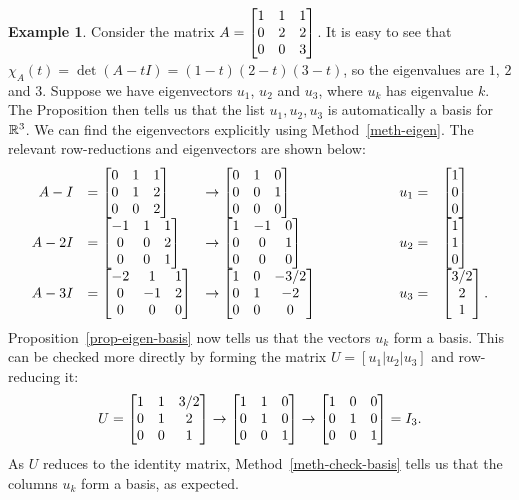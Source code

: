 \documentclass[reqno]{amsart}
\theoremstyle{definition}
\newtheorem{example}[theorem]{Example}
\begin{document}
\begin{example}\label{eg-eigen-basis-i}
 Consider the matrix $A=\left[\begin{matrix} 1&1&1 \\ 0&2&2 \\ 0&0&3\end{matrix}\right]$.  It is easy
 to see that $\chi_A(t)=\det(A-tI)=(1-t)(2-t)(3-t)$, so the
 eigenvalues are $1$, $2$ and $3$.  Suppose we have eigenvectors
 $u_1$, $u_2$ and $u_3$, where $u_k$ has eigenvalue $k$.  The
 Proposition then tells us that the list $u_1,u_2,u_3$ is
 automatically a basis for ${\mathbb{R}}^3$.  We can find the eigenvectors
 explicitly using Method~\ref{meth-eigen}.  The relevant
 row-reductions and eigenvectors are shown below:
 \[ \begin{array}{rllcrl}
  A-I  &=   \left[\begin{matrix} 0 & 1 & 1 \\ 0 & 1 & 2 \\ 0 & 0 & 2 \end{matrix}\right]
       &\to \left[\begin{matrix} 0 & 1 & 0 \\ 0 & 0 & 1 \\ 0 & 0 & 0 \end{matrix}\right]
       & \hspace{4em} & u_1 = & \left[\begin{matrix} 1 \\ 0 \\ 0 \end{matrix}\right] \\
  A-2I &=   \left[\begin{matrix}-1 & 1 & 1 \\ 0 & 0 & 2 \\ 0 & 0 & 1 \end{matrix}\right]
       &\to \left[\begin{matrix} 1 &-1 & 0 \\ 0 & 0 & 1 \\ 0 & 0 & 0 \end{matrix}\right]
       & \hspace{4em} & u_2 = & \left[\begin{matrix} 1 \\ 1 \\ 0 \end{matrix}\right] \\
  A-3I &=   \left[\begin{matrix}-2 & 1 & 1 \\ 0 &-1 & 2 \\ 0 & 0 & 0 \end{matrix}\right]
       &\to \left[\begin{matrix} 1 & 0 & -3/2 \\ 0 & 1 &-2 \\ 0 & 0 & 0 \end{matrix}\right]
       & \hspace{4em} & u_3 = & \left[\begin{matrix} 3/2 \\ 2 \\ 1 \end{matrix}\right].
 \end{array}\]
 Proposition~\ref{prop-eigen-basis} now tells us that the vectors
 $u_k$ form a basis.  This can be checked more directly by forming the
 matrix $U=[u_1|u_2|u_3]$ and row-reducing it:
 \[ U = \left[\begin{matrix} 1 & 1 & 3/2 \\ 0 & 1 & 2 \\ 0 & 0 & 1 \end{matrix}\right]
    \to \left[\begin{matrix} 1 & 1 & 0 \\ 0 & 1 & 0 \\ 0 & 0 & 1 \end{matrix}\right]
    \to \left[\begin{matrix} 1 & 0 & 0 \\ 0 & 1 & 0 \\ 0 & 0 & 1 \end{matrix}\right] = I_3.
 \]
 As $U$ reduces to the identity matrix, Method~\ref{meth-check-basis}
 tells us that the columns $u_k$ form a basis, as expected.
\end{example}
\end{document}
